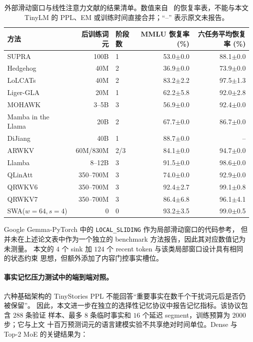 \documentclass[letterpaper]{article}
\begin{document}
\begin{table}[t]
\centering
\scriptsize
\caption{外部滑动窗口与线性注意力文献的结果清单。数值来自~\cite{jolicoeur2026sliding} 的恢复率表，不能与本文 TinyLM 的 PPL、EM 或训练时间直接合并；``--'' 表示原文未报告。}
\label{tab:external-swa-list}
\begin{tabular}{l r l r r}
\toprule
方法 & 后训练词元 & 阶段数 & MMLU 恢复率 (\%) & 六任务平均恢复率 (\%) \\
\midrule
SUPRA & 100B & 1 & 53.0$\pm$0.0 & 88.1$\pm$0.0 \\
Hedgehog & 40M & 2 & 36.9$\pm$0.0 & 73.9$\pm$0.0 \\
LoLCATs & 40M & 2 & 83.2$\pm$2.2 & 97.5$\pm$1.3 \\
Liger-GLA & 20M & 1 & 62.2$\pm$5.8 & 92.0$\pm$2.8 \\
MOHAWK & 3--5B & 3 & 56.9$\pm$0.0 & 92.4$\pm$0.0 \\
Mamba in the Llama & 20B & 2 & 67.7$\pm$0.0 & 86.7$\pm$0.0 \\
DiJiang & 40B & 1 & 88.7$\pm$0.0 & -- \\
ARWKV & 60M/830M & 2/3 & 84.1$\pm$0.0 & 94.7$\pm$0.0 \\
Llamba & 8--12B & 3 & 91.5$\pm$0.0 & 98.6$\pm$0.0 \\
QLinAtt & 350--700M & 3 & 74.0$\pm$0.0 & 92.9$\pm$0.0 \\
QRWKV6 & 350--700M & 3 & 92.4$\pm$2.7 & 99.1$\pm$0.8 \\
QRWKV7 & 350--700M & 3 & 86.4$\pm$6.8 & 96.1$\pm$4.1 \\
SWA($w=64,s=4$) & 0 & 0 & 93.2$\pm$3.5 & 99.0$\pm$0.5 \\
\bottomrule
\end{tabular}
\end{table}

Google Gemma-PyTorch 中的 \texttt{LOCAL\_SLIDING} 作为局部滑动窗口的代码参考，
但并未在上述论文表中作为一个独立的 benchmark 方法报告，因此其对应数值记为未测量。
本文的 $4$ 个 sink 加 $124$ 个 recent token 与该类局部窗口设计具有相同的状态约束
思想，但额外添加了内容门控事实槽位。

\paragraph{事实记忆压力测试中的端到端对照。}
六种基础架构的 TinyStories PPL 不能回答“重要事实在数千个干扰词元后是否仍被保留”。
因此，本文进一步在独立的选择性记忆协议中报告记忆指标。该协议包含 $288$ 条验证
样本、最多 $8$ 条临时事实和 $16$ 个延迟 segment，训练预算为 $2000$ 步；它与上文
十百万预测词元的语言建模实验不共享绝对时间单位。Dense 与 Top-2 MoE 的关键结果为：
\end{document}
